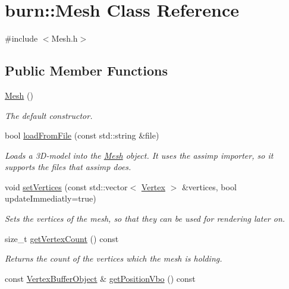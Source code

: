 \hypertarget{classburn_1_1_mesh}{\section{burn\-:\-:Mesh Class Reference}
\label{classburn_1_1_mesh}
}


{\ttfamily \#include $<$Mesh.\-h$>$}

\subsection*{Public Member Functions}
\begin{DoxyCompactItemize}
\item 
\hyperlink{classburn_1_1_mesh_a35d4706a490d0f2bb190b6b785621e07}{Mesh} ()
\begin{DoxyCompactList}\small\item\em The default constructor. \end{DoxyCompactList}\item 
bool \hyperlink{classburn_1_1_mesh_a3179d5730bfcf0e781b1c0daebfc7439}{load\-From\-File} (const std\-::string \&file)
\begin{DoxyCompactList}\small\item\em Loads a 3\-D-\/model into the \hyperlink{classburn_1_1_mesh}{Mesh} object. It uses the assimp importer, so it supports the files that assimp does. \end{DoxyCompactList}\item 
void \hyperlink{classburn_1_1_mesh_a5a1a3f1c48bd2d26872458d2ae8f81d1}{set\-Vertices} (const std\-::vector$<$ \hyperlink{classburn_1_1_vertex}{Vertex} $>$ \&vertices, bool update\-Immediatly=true)
\begin{DoxyCompactList}\small\item\em Sets the vertices of the mesh, so that they can be used for rendering later on. \end{DoxyCompactList}\item 
size\-\_\-t \hyperlink{classburn_1_1_mesh_a076016c8452ff794880480626394e44c}{get\-Vertex\-Count} () const 
\begin{DoxyCompactList}\small\item\em Returns the count of the vertices which the mesh is holding. \end{DoxyCompactList}\item 
const \hyperlink{classburn_1_1_vertex_buffer_object}{Vertex\-Buffer\-Object} \& \hyperlink{classburn_1_1_mesh_af50ea58af85e6bcf838e7b0f37ce3d6a}{get\-Position\-Vbo} () const 

\end{DoxyCompactItemize}
